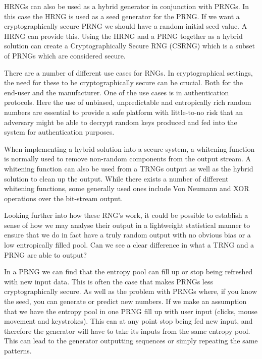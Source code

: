 \documentclass[]{final_report}
\begin{document}
\par{HRNGs can also be used as a hybrid generator in conjunction with PRNGs. In this case the HRNG is used as a seed generator for the PRNG. If we want a cryptographically secure PRNG we should have a random initial seed value. A HRNG can provide this. Using the HRNG and a PRNG together as a hybrid solution can create a Cryptographically Secure RNG (CSRNG) which is a subset of PRNGs which are considered secure.}

\par{There are a number of different use cases for RNGs. In cryptographical settings, the need for these to be cryptographically secure can be crucial. Both for the end-user and the manufacturer. One of the use cases is in authentication protocols\cite{Han:2009}. Here the use of unbiased, unpredictable and entropically rich random numbers are essential to provide a safe platform with little-to-no risk that an adversary might be able to decrypt random keys produced and fed into the system for authentication purposes.}

\par{When implementing a hybrid solution into a secure system, a whitening function is normally used to remove non-random components from the output stream\cite{Holleman:2008}. A whitening function can also be used from a TRNGs output as well as the hybrid solution to clean up the output. While there exists a number of different whitening functions, some generally used ones include Von Neumann and XOR operations over the bit-stream output.}

\par{Looking further into how these RNG’s work, it could be possible to establish a sense of how we may analyse their output in a lightweight statistical manner to ensure that we do in fact have a truly random output with no obvious bias or a low entropically filled pool. Can we see a clear difference in what a TRNG and a PRNG are able to output?}

\par{In a PRNG we can find that the entropy pool can fill up or stop being refreshed with new input data. This is often the case that makes PRNGs less cryptographically secure. As well as the problem with PRNGs where, if you know the seed, you can generate or predict new numbers. If we make an assumption that we have the entropy pool in one PRNG fill up with user input (clicks, mouse movement and keystrokes). This can at any point stop being fed new input, and therefore the generator will have to take its inputs from the same entropy pool. This can lead to the generator outputting sequences or simply repeating the same patterns.}
\end{document}
